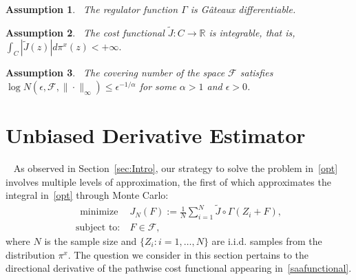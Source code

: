 \documentclass[11pt,leqno]{amsart}
\newtheorem{assumption}{Assumption}
\begin{document}
\begin{assumption}~\label{ass:gamma}
    The regulator function $\Gamma$ is G\^{a}teaux differentiable.
\end{assumption}


\begin{assumption}~\label{ass:composed} The cost functional $\tilde J : C \to \mathbb{R}$ is integrable, that is,
\(
    \int_C \left|\tilde{J}(z)\right| d\pi^x(z) < +\infty.
\)\end{assumption}

\begin{assumption}~\label{ass:covering}
The covering number of the space $\mathcal F$ satisfies $\log N(\epsilon,\mathcal{F},\|\cdot\|_{\infty}) \leq \epsilon^{-1/\alpha}$ for some $\alpha > 1$ and $\epsilon > 0$.
\end{assumption}

\section{Unbiased Derivative Estimator}~\label{sec:dir-der}
As observed in Section~\ref{sec:Intro}, our strategy to solve the problem in~\eqref{opt} involves multiple levels of approximation, the first of which approximates the integral in~\eqref{opt} through Monte Carlo:
\begin{align}~\label{saafunctional}~\tag{MC-OPT}
    \text{minimize}&~J_N(F):=\frac{1}{N} \sum_{i=1}^N \tilde J \circ \Gamma (Z_i + F),\\
    \text{subject to:}&~F \in \mathcal F, \nonumber
\end{align}
where $N$ is the sample size and $\{Z_i : i = 1,\ldots, N\}$ are i.i.d. samples from the distribution $\pi^x$. The question we consider in this section pertains to the directional derivative of the pathwise cost functional appearing in~\eqref{saafunctional}. 
\end{document}
